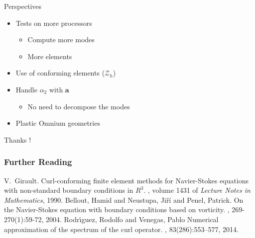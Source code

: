 \documentclass{beamer}
\newcommand{\Z}{{\bm{\mathcal{Z}}}}
\begin{document}
\begin{frame}{Perspectives}
\begin{itemize}
\item Tests on more processors
\begin{itemize}
\item Compute more modes
\item More elements
\end{itemize}
\item Use of conforming elements ($\Z_h$)
\item Handle $\alpha_2$ with $\mathbf{a}$
\begin{itemize}
\item No need to decompose the modes
\end{itemize}
\item Plastic Omnium geometries 
\end{itemize}
\end{frame}

\begin{frame}
\begin{center}
Thanks !
\end{center}
\end{frame}

\begin{frame}[allowframebreaks]
  \frametitle<presentation>{Further Reading}
  \begin{thebibliography}{10}
    \beamertemplatebookbibitems
    V.~Girault.
    \newblock Curl-conforming finite element methods for Navier-Stokes equations with non-standard boundary conditions in $R^3$.
    , volume 1431 of {\em Lecture Notes in Mathematics}, 1990.
    \beamertemplatearticlebibitems
    Bellout, Hamid and Neustupa, Jiří and Penel, Patrick.
    \newblock On the Navier-Stokes equation with boundary conditions based on vorticity.
    , 269-270(1):59-72, 2004.
    \beamertemplatearticlebibitems
    Rodr\'{\i}guez, Rodolfo and Venegas, Pablo
    \newblock Numerical approximation of the spectrum of the curl operator.
    , 83(286):553–577, 2014.
  \end{thebibliography}
  \end{frame}
\end{document}
